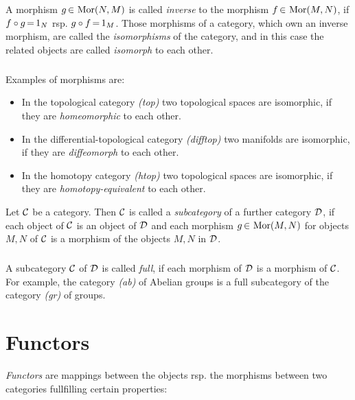 \documentclass[11pt,twoside]{article}
\begin{document}
\begin{definition} %
A morphism $g \xeof \operatorname{Mor}(N,M)$ is called \textit{inverse}
to the morphism $f \xeof \operatorname{Mor}(M,N)$,
if $f \circ g \eq 1_N$ rsp. $g \circ f \eq 1_M$.
Those morphisms of a category,
which own an inverse morphism, 
are called the \textit{isomorphisms} of the category,
and in this case the related objects are called \textit{isomorph} to each other.
\end{definition}

\subparagraph{}
Examples of morphisms are:

\begin{itemize}
\item[1.]
In the topological category \textit{(top)}
two topological spaces are isomorphic,
if they are \textit{homeomorphic} to each other. 

\item[2.]
In the differential-topological category \textit{(difftop)}
two manifolds are isomorphic,
if they are \textit{diffeomorph} to each other. 

\item[3.]
In the homotopy category \textit{(htop)} two topological spaces are isomorphic,
if they are \textit{homotopy-equivalent} to each other.
\end{itemize}

\begin{definition}
Let $\cal{C}$ be a category.
Then $\cal{C}$ is called a \textit{subcategory}
of a further category $\cal{D}$,
if each object of $\cal{C}$ is an object of $\cal{D}$
and each morphism $g \xeof \operatorname{Mor}(M,N)$
for objects $M,N$ of $\cal{C}$
is a morphism of the objects $M,N$ in $\cal{D}$.
\end{definition}

\subparagraph{} %
A subcategory $\cal{C}$ of $\cal{D}$ is called \textit{full},
if each morphism of $\cal{D}$ is a morphism of $\cal{C}$.
For example,
the category \textit{(ab)} of Abelian groups is a full subcategory
of the category \textit{(gr)} of groups.

\section{Functors}
\textit{Functors} are mappings between the objects rsp. the morphisms 
between two categories fullfilling certain properties:
\end{document}
